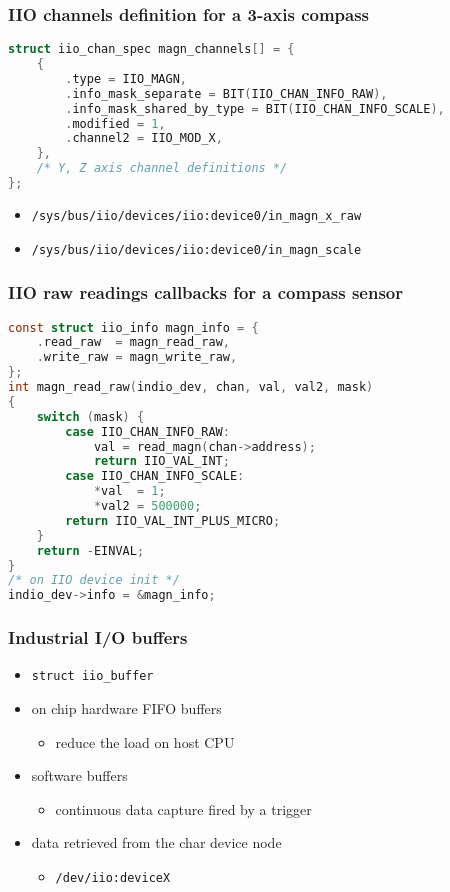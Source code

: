 \documentclass[aspectratio=169]{beamer}
\begin{document}

\begin{frame}[fragile]
\frametitle{IIO channels definition for a 3-axis compass}
\begin{lstlisting}[language=C]
struct iio_chan_spec magn_channels[] = {
    {
        .type = IIO_MAGN,
        .info_mask_separate = BIT(IIO_CHAN_INFO_RAW),
        .info_mask_shared_by_type = BIT(IIO_CHAN_INFO_SCALE),
        .modified = 1,
        .channel2 = IIO_MOD_X,
    },
    /* Y, Z axis channel definitions */
};
\end{lstlisting}
\begin{itemize}
    \item \texttt{/sys/bus/iio/devices/iio:device0/in\_magn\_x\_raw}
    \item \texttt{/sys/bus/iio/devices/iio:device0/in\_magn\_scale}
\end{itemize}
\end{frame}


\begin{frame}[fragile]
\frametitle{IIO raw readings callbacks for a compass sensor}
\begin{lstlisting}[language=C]
const struct iio_info magn_info = {
    .read_raw  = magn_read_raw,
    .write_raw = magn_write_raw,
};
int magn_read_raw(indio_dev, chan, val, val2, mask)
{
    switch (mask) {
        case IIO_CHAN_INFO_RAW:
            val = read_magn(chan->address);
            return IIO_VAL_INT;
        case IIO_CHAN_INFO_SCALE:
            *val  = 1;
            *val2 = 500000;
        return IIO_VAL_INT_PLUS_MICRO;
    }
    return -EINVAL;
}
/* on IIO device init */
indio_dev->info = &magn_info;

\end{lstlisting}
\end{frame}


\begin{frame}
\frametitle{Industrial I/O buffers}
\begin{itemize}
    \item \texttt{struct iio\_buffer}
    \item on chip hardware FIFO buffers
    \begin{itemize}
        \item reduce the load on host CPU
    \end{itemize}
    \item software buffers
    \begin{itemize}
        \item continuous data capture fired by a trigger
     \end{itemize}
    \item data retrieved from the char device node
    \begin{itemize}
        \item \texttt{/dev/iio:deviceX}
     \end{itemize}
\end{itemize}
\end{frame}
\end{document}
